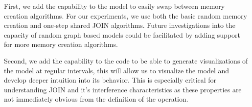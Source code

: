 First, we add the capability to the model to easily swap between memory creation algorithms. For our experiments, we use both the basic random memory creation and one-step shared JOIN algorithms. Future investigations into the capacity of random graph based models could be facilitated by adding support for more memory creation algorithms. 

Second, we add the capability to the code to be able to generate visualizations of the model at regular intervals, this will allow us to visualize the model and develop deeper intuition into its behavior. This is especially critical for understanding JOIN and it's interference characteristics as these properties are not immediately obvious from the definition of the operation. 